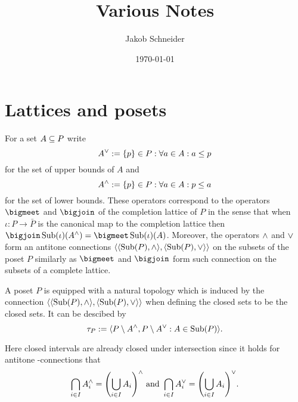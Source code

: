 \documentclass[8pt,a4paper]{article}
\begin{document}
\title{Various Notes}
\author{Jakob Schneider}
\date{\today}
\maketitle
\label{a}

\section{Lattices and posets}

\begin{definition}
    
\end{definition}%

%
\begin{definition}
    For a set $A\subseteq P$ write
    $$A^{\join}:=\set{p\in P: \forall a\in A: a\leq p}$$
    for the set of upper bounds of $A$ and
    $$A^{\meet}:=\set{p\in P: \forall a\in A: p\leq a}$$
    for the set of lower bounds. These operators correspond to the operators $\bigmeet$ and $\bigjoin$ of the completion lattice of $P$ in the sense that when $\iota:P\to \bar{P}$ is the canonical map to the completion lattice then $\bigjoin\Sub(\iota)(A^{\meet})=\bigmeet\Sub(\iota)(A)$. Moreover, the operators $\wedge$ and $\vee$ form an antitone  connections $\struct{\struct{\Sub(P),\meet},\struct{\Sub(P),\join}}$ on the subsets of the poset $P$ similarly as $\bigmeet$ and $\bigjoin$ form such connection on the subsets of a complete lattice. 
\end{definition}

\begin{definition}
    A poset $P$ is equipped with a natural topology which is induced by the  connection $\struct{\struct{\Sub(P),\meet},\struct{\Sub(P),\join}}$ when defining the closed sets to be the  closed sets. It can be descibed by $$\tau_P:=\gen{P\setminus A^{\meet},P\setminus A^{\join}: A\in\Sub(P)}.$$
\end{definition}
%
\begin{remark}
    Here closed intervals are already closed under intersection since it holds for antitone -connections that
    $$\bigcap_{i\in I}{A_i^{\wedge}}={\left(\bigcup_{i\in I}{A_i}\right)}^{\wedge} \textrm{ and } \bigcap_{i\in I}{A_i^{\vee}}={\left(\bigcup_{i\in I}{A_i}\right)}^{\vee}.$$
\end{remark}
\end{document}
